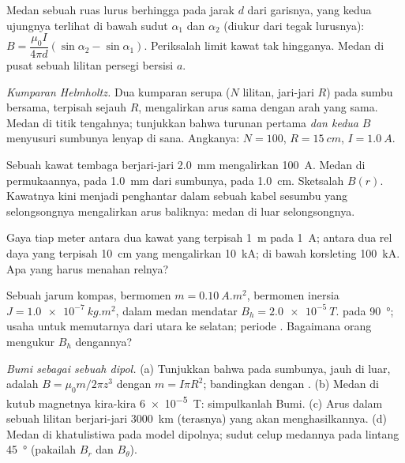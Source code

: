 \begin{exercise}[$\star\star$]\label{exo:b1:magnetostatics:5}
Medan sebuah ruas lurus berhingga pada jarak $d$ dari garisnya, yang kedua
ujungnya terlihat di bawah sudut $\alpha_1$ dan $\alpha_2$ (diukur dari
tegak lurusnya): $B = \dfrac{\mu_0I}{4\pi d}(\sin\alpha_2 - \sin\alpha_1)$. Periksalah
limit kawat tak hingganya. Medan di pusat sebuah lilitan persegi bersisi
$a$.
\end{exercise}

\begin{exercise}[$\star\star$]\label{exo:b1:magnetostatics:6}
\emph{Kumparan Helmholtz.} Dua kumparan serupa ($N$ lilitan, jari-jari $R$) pada
sumbu bersama, terpisah sejauh $R$, mengalirkan arus sama dengan arah yang sama.
Medan di titik tengahnya; tunjukkan bahwa turunan pertama \emph{dan kedua}
$B$ menyusuri sumbunya lenyap di sana. Angkanya: $N = 100$,
$R = \qty{15}{cm}$, $I = \qty{1.0}{A}$.
\end{exercise}

\begin{exercise}[$\star\star$]\label{exo:b1:magnetostatics:7}
Sebuah kawat tembaga berjari-jari \qty{2.0}{mm} mengalirkan \qty{100}{A}. Medan di
permukaannya, pada \qty{1.0}{mm} dari sumbunya, pada \qty{1.0}{cm}. Sketsalah $B(r)$.
Kawatnya kini menjadi penghantar dalam sebuah kabel sesumbu yang selongsongnya
mengalirkan arus baliknya: medan di luar selongsongnya.
\end{exercise}

\begin{exercise}[$\star\star$]\label{exo:b1:magnetostatics:8}
Gaya tiap meter antara dua kawat yang terpisah \qty{1}{m} pada \qty{1}{A}; antara
dua rel daya yang terpisah \qty{10}{cm} yang mengalirkan \qty{10}{kA}; di bawah
korsleting \qty{100}{kA}. Apa yang harus menahan relnya?
\end{exercise}

\begin{exercise}[$\star\star$]\label{exo:b1:magnetostatics:9}
Sebuah jarum kompas, bermomen $m = \qty{0.10}{A.m^2}$, bermomen inersia
$J = \qty{1.0e-7}{kg.m^2}$, dalam medan mendatar $B_h = \qty{2.0e-5}{T}$.
 pada \qty{90}{\degree}; usaha untuk memutarnya dari utara ke selatan; periode
. Bagaimana orang mengukur $B_h$ dengannya?
\end{exercise}

\begin{exercise}[$\star\star\star$]\label{exo:b1:magnetostatics:10}
\emph{Bumi sebagai sebuah dipol.} (a) Tunjukkan bahwa pada sumbunya, jauh di luar,
 adalah $B = \mu_0m/2\pi z^3$ dengan $m = I\pi R^2$; bandingkan dengan
. (b) Medan di kutub magnetnya kira-kira
\qty{6e-5}{T}: simpulkanlah  Bumi. (c) Arus dalam sebuah lilitan
berjari-jari \qty{3000}{km} (terasnya) yang akan menghasilkannya. (d) Medan di
khatulistiwa pada model dipolnya; sudut celup medannya pada
lintang \qty{45}{\degree} (pakailah $B_r$ dan $B_\theta$).
\end{exercise}

